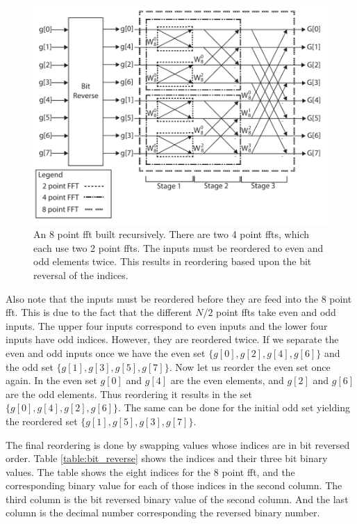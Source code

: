 \begin{figure}
\centering
\includegraphics[width=  \textwidth]{images/8ptFFT}
\caption{An 8 point \gls{fft} built recursively. There are two 4 point \gls{fft}s, which each use two 2 point \gls{fft}s. The inputs must be reordered to even and odd elements twice. This results in reordering based upon the bit reversal of the indices.}
\label{fig:8ptFFT}
\end{figure}

Also note that the inputs must be reordered before they are feed into the 8 point \gls{fft}. This is due to the fact that the different $N/2$ point \gls{fft}s take even and odd inputs. The upper four inputs correspond to even inputs and the lower four inputs have odd indices. However, they are reordered twice. If we separate the even and odd inputs once we have the even set $\{g[0], g[2], g[4], g[6] \}$ and the odd set $\{g[1], g[3], g[5], g[7] \}$. Now let us reorder the even set once again. In the even set $g[0]$ and $g[4]$ are the even elements, and $g[2]$ and $g[6]$ are the odd elements. Thus reordering it results in the set $\{g[0], g[4], g[2], g[6] \}$. The same can be done for the initial odd set yielding the reordered set $\{g[1], g[5], g[3], g[7] \}$. 

The final reordering is done by swapping values whose indices are in bit reversed order. Table \ref{table:bit_reverse} shows the indices and their three bit binary values. The table shows the eight indices for the 8 point \gls{fft}, and the corresponding binary value for each of those indices in the second column. The third column is the bit reversed binary value of the second column. And the last column is the decimal number corresponding the reversed binary number. 

